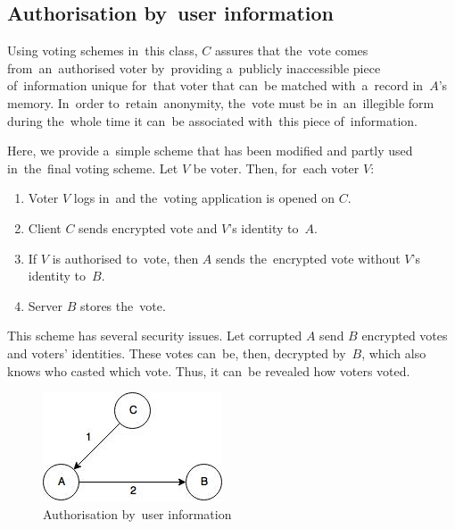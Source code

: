 \subsection{Authorisation by~user information}
Using voting schemes in~this class, $C$ assures that the~vote comes from~an~authorised voter by~providing a~publicly inaccessible piece of~information unique for~that voter that can~be matched with~a~record in~$A$'s memory. In~order to~retain~anonymity, the~vote must be in~an~illegible form during the~whole time it can~be associated with~this piece of~information.

Here, we provide a~simple scheme that has been modified and partly used in~the~final voting scheme.
\bigbreak
Let $V$ be voter. Then, for~each voter $V$:
\begin{enumerate}
\item Voter $V$ logs in~and the~voting application is opened on $C$.
\item Client $C$ sends encrypted vote and $V$'s identity to~$A$.
\item If $V$ is authorised to~vote, then $A$ sends the~encrypted vote without $V$'s identity to~$B$.
\item Server $B$ stores the~vote. 
\end{enumerate}
This scheme has several security issues. Let corrupted $A$ send $B$ encrypted votes and voters' identities. These votes can~be, then, decrypted by~$B$, which also knows who casted which vote. Thus, it can~be revealed how voters voted.
\begin{figure}[h]
\begin{center}
\includegraphics{images/PE1}
\caption{Authorisation by~user information}
\end{center}
\end{figure}










